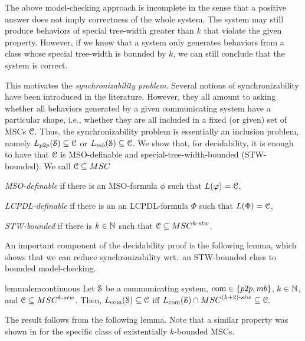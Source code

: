 \documentclass[a4paper,UKenglish,cleveref, autoref, thm-restate]{lipics-v2021}
\begin{document}
The above model-checking approach is incomplete in the sense that
a positive answer does not imply correctness of the whole
system. The system may still produce behaviors of special tree-width greater than $k$
that violate the given property.
However, if we know that a system only generates
behaviors from a class whose special tree-width is bounded by $k$,
we can still conclude that the system is correct.

This motivates the \emph{synchronizability problem}.
Several notions of synchronizability have been introduced in the literature.
However, they all amount to asking whether all behaviors generated by
a given communicating system have a particular shape,
i.e., whether they are all included in a fixed (or given) set of MSCs $\mathcal{C}$.
Thus, the synchronizability problem is essentially an inclusion problem,
namely $\ppL{\Sys} \subseteq \Class$ or $\mbL{\Sys} \subseteq \Class$.
%
We show that, for decidability, it is enough to have that $\mathcal{C}$
is MSO-definable and special-tree-width-bounded (STW-bounded):
%
We call $\Class \subseteq \MSCs$
\begin{enumerate*}[label={(\roman*)}]
\item \emph{MSO-definable} if there is
an MSO-formula $\phi$ such that $L(\varphi) = \mathcal{C}$,
\item \emph{LCPDL-definable} if there is an
an LCPDL-formula $\Phi$ such that $L(\Phi) = \mathcal{C}$,
\item \emph{STW-bounded} if there is $k \in \mathbb{N}$
such that $\Class \subseteq \stwMSCs{k}$.
\end{enumerate*}

An important component of the decidability proof is the following lemma,
which shows that we can reduce synchronizability
wrt.\ an STW-bounded class to bounded model-checking.

\begin{restatable}{lemma}{lemcontinuous}\label{lem:continuous}
Let $\mathcal{S}$ be a communicating system, $\comsymb \in \{\ppsymb, \mbsymb\}$,
$k \in \mathbb{N}$, and $\Class \subseteq \stwMSCs{k}$.
Then, $L_{\textup{com}}(\mathcal{S}) \subseteq \mathcal{C}$ iff
$\cL{\System} \cap \stwMSCs{(k+2)} \subseteq \Class$.
\end{restatable}

The result follows from the following lemma.
Note that a similar property
was shown in \cite[Proposition~5.4]{GKM07} for the specific class of existentially
$k$-bounded MSCs.
\end{document}
